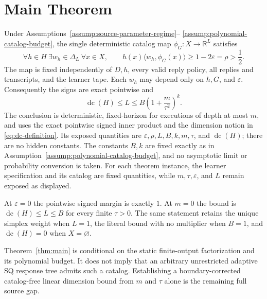 \section{Main Theorem}\label{sec:main-theorem}

\begin{theorem}\label{thm:main}
Under Assumptions~\ref{assump:source-parameter-regime}--
\ref{assump:polynomial-catalog-budget}, the single deterministic catalog map
$\phi_G:X\to\mathbb R^L$ satisfies
\[
\forall h\in H\ \exists w_h\in\Delta_L\ \forall x\in X,\qquad
h(x)\langle w_h,\phi_G(x)\rangle
\ge 1-2\varepsilon=\rho>\frac12.
\]
The map is fixed independently of $D,h$, every valid reply policy, all replies
and transcripts, and the learner tape.  Each $w_h$ may depend only on
$h,G$, and $\varepsilon$.  Consequently the signs are exact pointwise and
\[
\operatorname{dc}(H)\le L
\le B\left(1+\frac{m}{\tau^2}\right)^k.
\]
The conclusion is deterministic, fixed-horizon for executions of depth at
most $m$, and uses the exact pointwise signed inner product and the dimension
notion in \eqref{eq:dc-definition}.  Its exposed quantities are
$\varepsilon,\rho,L,B,k,m,\tau$, and $\operatorname{dc}(H)$; there are no
hidden constants.  The constants $B,k$ are fixed exactly as in
Assumption~\ref{assump:polynomial-catalog-budget}, and no asymptotic limit or
probability conversion is taken.  For each theorem instance, the learner
specification and its catalog are fixed quantities, while
$m,\tau,\varepsilon$, and $L$ remain exposed as displayed.

At $\varepsilon=0$ the pointwise signed margin is exactly $1$.  At $m=0$
the bound is $\operatorname{dc}(H)\le L\le B$ for every finite $\tau>0$.
The same statement retains the unique simplex weight when $L=1$, the literal
bound with no multiplier when $B=1$, and $\operatorname{dc}(H)=0$ when
$X=\varnothing$.
\end{theorem}

Theorem~\ref{thm:main} is conditional on the static finite-output
factorization and its polynomial budget.  It does not imply that an arbitrary
unrestricted adaptive SQ response tree admits such a catalog.  Establishing a
boundary-corrected catalog-free linear dimension bound from $m$ and $\tau$
alone is the remaining full source gap.
